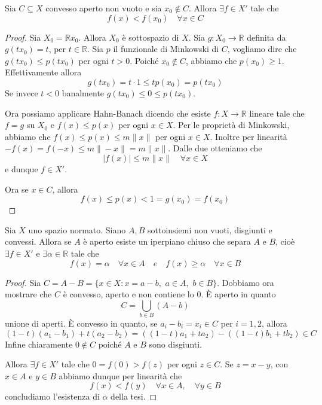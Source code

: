 \begin{lemma}
    Sia \(C \subseteq X \) convesso aperto non vuoto e sia \(x_{0} \not\in C\).
    Allora \(\exists f \in X'\) tale che 
    \[
      f{(x)} < f{(x_{0})} \quad \forall x \in C
    \]
\end{lemma}
\begin{proof}{}
Sia \(X_{0} = \mathbb{R}x_{0}\). Allora \(X_{0}\) è sottospazio di \(X\). Sia
\(g : X_{0} \to \mathbb{R}\) definita da \(g{(tx_{0})} = t\), per \(t \in
\mathbb{R}\). Sia \(p\) il funzionale di Minkowski di \(C\), vogliamo dire che
\(g{(tx_{0})} \le p {(tx_{0})}\) per ogni \(t > 0\). Poiché \(x_{0} \not\in C\),
abbiamo che \(p {(x_{0})} \ge 1\). Effettivamente allora
\[
  g {(tx_{0})} = t \cdot  1 \le t p {(x_{0})} = p {(t x_{0})}
\]
Se invece \(t < 0\) banalmente \(g {(tx_{0})} \le  0 \le  p {(t x_{0})}\).

Ora possiamo applicare Hahn-Banach dicendo che esiste \(f : X \to \mathbb{R}\)
lineare tale che \(f = g\) su \(X_{0}\) e \(f{(x)} \le  p {(x)}\) per ogni \(x
\in X\). Per le proprietà di Minkowski, abbiamo che \(f {(x)} \le  p {(x)} \le  m \|x\|\) per ogni \(x \in X\). Inoltre per linearità \(-f{(x)} = f{(-x)} \le m \|-x\| = m \|x\|\). Dalle due otteniamo che
\[|f{(x)}| \le m \|x\| \quad \forall x \in X\] 
e dunque \(f \in X'\).

Ora se \(x \in C\), allora
\[
  f{(x)} \le p {(x)} < 1 = g{(x_{0})} = f{(x_{0})}
\]
\end{proof}
\begin{theorem}
    Sia \(X\) uno spazio normato. Siano \(A, B\) sottoinsiemi non vuoti,
    disgiunti e convessi. Allora se \(A\) è aperto esiste un iperpiano chiuso
    che separa \(A\) e \(B\), cioè \(\exists f \in X'\) e \(\exists \alpha \in \mathbb{R}\) tale che 
    \[
      f{(x)} = \alpha \quad \forall x \in A \quad e \quad f{(x)}\ge \alpha \quad
      \forall x \in B
    \]
\end{theorem}

\begin{proof}{}
    Sia \(C = A - B = \{x \in X : x = a-b, \,\, a \in A, \,\, b \in B\} \).
    Dobbiamo ora mostrare che \(C\) è convesso, aperto e non contiene lo 0. È
    aperto in quanto
    \[
      C = \bigcup_{b \in B} {(A - b)} 
    \]
    unione di aperti. È convesso in quanto, se \(a_{i} - b_{i} = x_{i} \in C\)
    per \(i = 1,2\), allora
    \[
      {(1-t)}{(a_{1} - b_{1})} + t {(a_{2} -b_{2})} = ({(1-t)}a_{1} + ta_{2}) - {({(1-t)}b_{1} + tb_{2})} \in C
    \]
    Infine chiaramente \(0 \not\in C\) poiché \(A\) e \(B\) sono disgiunti.

    Allora \(\exists f \in X'\) tale che \(0 = f{(0)} > f{(z)}\) per ogni \(z
    \in C\). Se \(z = x-y\), con \(x \in A\) e \(y \in B\) abbiamo dunque per
    linearità che
    \[
      f{(x)} < f{(y)} \quad \forall x \in A, \quad \forall y \in B
    \]
    concludiamo l'esistenza di \(\alpha\) della tesi.
\end{proof}

